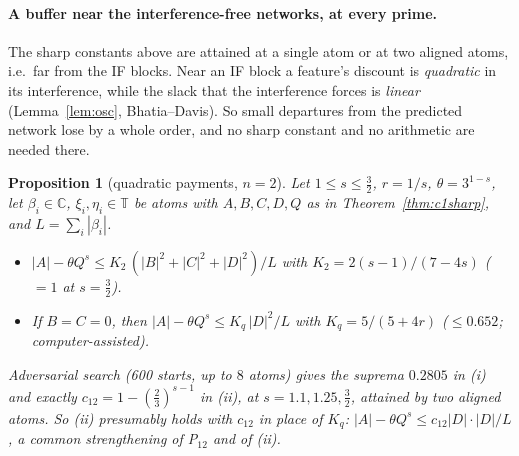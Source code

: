 \documentclass[11pt]{article}
\newtheorem{proposition}[theorem]{Proposition}
\theoremstyle{definition}
\begin{document}
\paragraph{A buffer near the interference-free networks, at every prime.}  The sharp constants above are attained at a single atom or at two aligned
atoms, i.e.\ far from the IF blocks.  Near an IF block a feature's discount is \emph{quadratic} in its interference, while the slack that the interference
forces is \emph{linear} (Lemma~\ref{lem:osc}, Bhatia--Davis).  So small departures from the predicted network lose by a whole order, and no sharp
constant and no arithmetic are needed there.
\begin{proposition}[quadratic payments, $n=2$]\label{prop:quadpay}
Let $1\le s\le\frac32$, $r=1/s$, $\theta=3^{1-s}$, let $\beta_i\in\mathbb C$, $\xi_i,\eta_i\in\mathbb T$ be atoms with $A,B,C,D,Q$ as in Theorem~\ref{thm:c1sharp}, and $L=\sum_i|\beta_i|$.
\begin{itemize}
\item[(i)] $|A|-\theta Q^s\le K_2\,(|B|^2+|C|^2+|D|^2)/L$ with $K_2=2(s-1)/(7-4s)$ ($=1$ at $s=\frac32$).
\item[(ii)] If $B=C=0$, then $|A|-\theta Q^s\le K_q\,|D|^2/L$ with $K_q=5/(5+4r)$ ($\le0.652$; computer-assisted).
\end{itemize}
Adversarial search (600 starts, up to $8$ atoms) gives the suprema $0.2805$ in (i) and \emph{exactly} $c_{12}=1-(\frac23)^{s-1}$ in (ii), at $s=1.1,1.25,\frac32$, attained by two aligned atoms.
So (ii) presumably holds with $c_{12}$ in place of $K_q$: $|A|-\theta Q^s\le c_{12}|D|\cdot|D|/L$, a common strengthening of P$_{12}$ and of (ii).
\end{proposition}
\end{document}
